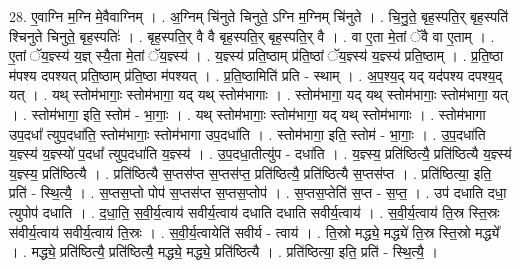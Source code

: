 \documentclass[17pt]{extarticle}
\begin{document}
28. ए॒वाग्नि म॒ग्नि मे॒वैवाग्निम् । . अ॒ग्निम् चि॑नुते चिनुते॒ ऽग्नि म॒ग्निम् चि॑नुते । . चि॒नु॒ते॒ बृह॒स्पति॒र् बृह॒स्पति॑ श्चिनुते चिनुते॒ बृह॒स्पतिः॑ । . बृह॒स्पति॒र् वै वै बृह॒स्पति॒र् बृह॒स्पति॒र् वै । . वा ए॒ता मे॒तां ॅवै वा ए॒ताम् । . ए॒तां ॅय॒ज्ञ्स्य॑ य॒ज्ञ् स्यै॒ता मे॒तां ॅय॒ज्ञ्स्य॑ । . य॒ज्ञ्स्य॑ प्रति॒ष्ठाम् प्र॑ति॒ष्ठां ॅय॒ज्ञ्स्य॑ य॒ज्ञ्स्य॑ प्रति॒ष्ठाम् । . प्र॒ति॒ष्ठा म॑पश्य दपश्यत् प्रति॒ष्ठाम् प्र॑ति॒ष्ठा म॑पश्यत् । . प्र॒ति॒ष्ठामिति॑ प्रति - स्थाम् । . अ॒प॒श्य॒द् यद् यद॑पश्य दपश्य॒द् यत् । . यथ् स्तोम॑भागाः॒ स्तोम॑भागा॒ यद् यथ् स्तोम॑भागाः । . स्तोम॑भागा॒ यद् यथ् स्तोम॑भागाः॒ स्तोम॑भागा॒ यत् । . स्तोम॑भागा॒ इति॒ स्तोम॑ - भा॒गाः॒ । . यथ् स्तोम॑भागाः॒ स्तोम॑भागा॒ यद् यथ् स्तोम॑भागाः । . स्तोम॑भागा उप॒दधा᳚ त्युप॒दधा॑ति॒ स्तोम॑भागाः॒ स्तोम॑भागा उप॒दधा॑ति । . स्तोम॑भागा॒ इति॒ स्तोम॑ - भा॒गाः॒ । . उ॒प॒दधा॑ति य॒ज्ञ्स्य॑ य॒ज्ञ्स्यो॑ प॒दधा᳚ त्युप॒दधा॑ति य॒ज्ञ्स्य॑ । . उ॒प॒दधा॒तीत्यु॑प - दधा॑ति । . य॒ज्ञ्स्य॒ प्रति॑ष्ठित्यै॒ प्रति॑ष्ठित्यै य॒ज्ञ्स्य॑ य॒ज्ञ्स्य॒ प्रति॑ष्ठित्यै । . प्रति॑ष्ठित्यै स॒प्तस॑प्त स॒प्तस॑प्त॒ प्रति॑ष्ठित्यै॒ प्रति॑ष्ठित्यै स॒प्तस॑प्त । . प्रति॑ष्ठित्या॒ इति॒ प्रति॑ - स्थि॒त्यै॒ । . स॒प्तस॒प्तो पोप॑ स॒प्तस॑प्त स॒प्तस॒प्तोप॑ । . स॒प्तस॒प्तेति॑ स॒प्त - स॒प्त॒ । . उप॑ दधाति दधा॒ त्युपोप॑ दधाति । . द॒धा॒ति॒ स॒वी॒र्य॒त्वाय॑ सवीर्य॒त्वाय॑ दधाति दधाति सवीर्य॒त्वाय॑ । . स॒वी॒र्य॒त्वाय॑ ति॒स्र स्ति॒स्रः स॑वीर्य॒त्वाय॑ सवीर्य॒त्वाय॑ ति॒स्रः । . स॒वी॒र्य॒त्वायेति॑ सवीर्य - त्वाय॑ । . ति॒स्रो मद्ध्ये॒ मद्ध्ये॑ ति॒स्र स्ति॒स्रो मद्ध्ये᳚ । . मद्ध्ये॒ प्रति॑ष्ठित्यै॒ प्रति॑ष्ठित्यै॒ मद्ध्ये॒ मद्ध्ये॒ प्रति॑ष्ठित्यै । . प्रति॑ष्ठित्या॒ इति॒ प्रति॑ - स्थि॒त्यै॒ । \newline
\end{document}
